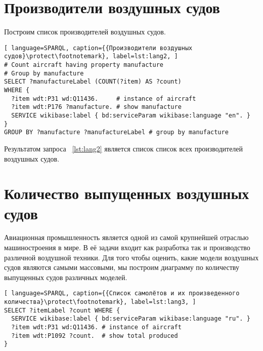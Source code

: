 \section{Производители воздушных судов}

Построим список производителей воздушных судов.

\begin{lstlisting}[ language=SPARQL, caption={{Производители воздушных судов}\protect\footnotemark}, label=lst:lang2, ]
# Count aircraft having property manufacture
# Group by manufacture
SELECT ?manufactureLabel (COUNT(?item) AS ?count) 
WHERE {
  ?item wdt:P31 wd:Q11436.     # instance of aircraft
  ?item wdt:P176 ?manufacture. # show manufacture
  SERVICE wikibase:label { bd:serviceParam wikibase:language "en". }
}
GROUP BY ?manufacture ?manufactureLabel # group by manufacture
\end{lstlisting}

Результатом запроса ~\ref{lst:lang2} является список список всех производителей воздушных судов. 


\section{Количество выпущенных воздушных судов}

Авиационная промышленность является одной из самой крупнейшей отраслью машиностроения в мире. 
В её задачи входит как разработка так и производство различной воздушной техники. 
Для того чтобы оценить, какие модели воздушных судов являются самыми массовыми, 
мы построим диаграмму по количеству выпущенных судов различных моделей.

\begin{lstlisting}[ language=SPARQL, caption={{Список самолётов и их произведенного количества}\protect\footnotemark}, label=lst:lang3, ]
SELECT ?itemLabel ?count WHERE {
  SERVICE wikibase:label { bd:serviceParam wikibase:language "ru". }
  ?item wdt:P31 wd:Q11436. # instance of aircraft
  ?item wdt:P1092 ?count.  # show total produced
}
\end{lstlisting}

